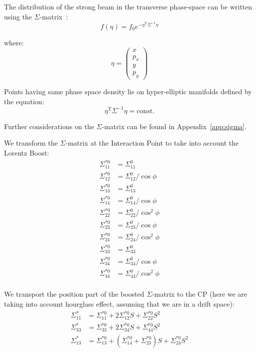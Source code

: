 The distribution of the strong beam in the transverse phase-space can be written using the $\Sigma$-matrix~\cite{wolski2014beam}:
\begin{equation}
f(\eta) = f_0 e^{{-\eta}^{\mathrm{T}} \Sigma^{-1}\eta}
\end{equation}

where:
\begin{equation}
\eta = \left(
\begin{matrix}
x\\
p_x\\
y\\
p_y
\end{matrix}
\right)
\end{equation}

Points having same phase space density lie on hyper-elliptic manifolds defined by the equation:
\begin{equation}
\eta^\mathrm{T}\Sigma^{-1}\eta = \mathrm{const.}
\label{eqellipse}
\end{equation}

Further considerations on the $\Sigma$-matrix can be found in Appendix~\ref{app:sigma}.

We transform the $\Sigma$-matrix at the Interaction Point to take into account the Lorentz Boost:
\begin{align}
\Sigma^{*0}_{11} &= \Sigma_{11} ^0\\
\Sigma^{*0}_{12} &= \Sigma_{12} ^0/\cos \phi\\
\Sigma^{*0}_{13} &= \Sigma_{13} ^0\\
\Sigma^{*0}_{14} &= \Sigma_{14} ^0/\cos \phi\\
\Sigma^{*0}_{22} &= \Sigma_{22} ^0/\cos^2 \phi\\
\Sigma^{*0}_{23} &= \Sigma_{23} ^0/\cos \phi\\
\Sigma^{*0}_{24} &= \Sigma_{24} ^0/\cos^2 \phi\\
\Sigma^{*0}_{33} &= \Sigma_{33} ^0\\
\Sigma^{*0}_{34} &= \Sigma_{34} ^0/\cos \phi\\
\Sigma^{*0}_{44} &= \Sigma_{44} ^0/\cos^2 \phi\\
\end{align}

We transport the position part of the boosted $\Sigma$-matrix to the CP (here we are taking into account hourglass effect, assuming that we are in a drift space):
\begin{align}
\Sigma^*_{11} &= \Sigma_{11} ^{*0}+2 \Sigma_{12} ^{*0} S+\Sigma_{22} ^{*0} S^2 \label{eq:TranspSig11}\\
\Sigma^*_{33} &= \Sigma_{33} ^{*0}+2 \Sigma_{34} ^{*0} S +\Sigma_{44} ^{*0} S^2\label{eq:TranspSig33}\\
\Sigma^*_{13} &= \Sigma_{13} ^{*0}+\left(\Sigma_{14} ^{*0} +\Sigma_{23}^{*0}\right) S +\Sigma_{24} ^{*0} S^2\label{eq:TranspSig13}
\end{align}

